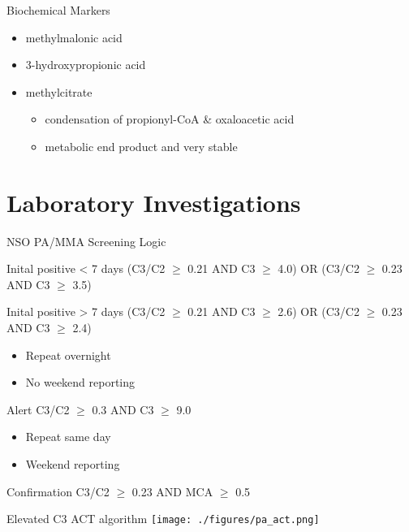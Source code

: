 \documentclass[presentation, smaller]{beamer}
\begin{document}
\begin{frame}[label={sec:orgheadline11}]{Biochemical Markers}
\begin{itemize}
\item methylmalonic acid
\item 3-hydroxypropionic acid
\item methylcitrate
\begin{itemize}
\item condensation of propionyl-CoA \& oxaloacetic acid
\item metabolic end product and very stable
\end{itemize}
\end{itemize}
\end{frame}

\section{Laboratory Investigations}
\label{sec:orgheadline19}
\begin{frame}[label={sec:orgheadline13}]{NSO PA/MMA Screening Logic}
\begin{block}{Inital positive \textless{} 7 days}
(C3/C2 \(\ge\) 0.21 AND C3 \(\ge\) 4.0)
OR
(C3/C2 \(\ge\) 0.23 AND C3 \(\ge\) 3.5)
\end{block}
\begin{block}{Inital positive \textgreater{} 7 days}
(C3/C2 \(\ge\) 0.21 AND C3 \(\ge\) 2.6)
OR
(C3/C2 \(\ge\) 0.23 AND C3 \(\ge\) 2.4)
\begin{itemize}
\item Repeat overnight
\item No weekend reporting
\end{itemize}
\end{block}
\begin{block}{Alert}
C3/C2 \(\ge\) 0.3 AND C3 \(\ge\) 9.0
\begin{itemize}
\item Repeat same day
\item Weekend reporting
\end{itemize}
\end{block}
\begin{block}{Confirmation}
C3/C2 \(\ge\) 0.23 AND MCA \(\ge\) 0.5
\end{block}
\end{frame}
\begin{frame}[label={sec:orgheadline14}]{Elevated C3 ACT algorithm}
\texttt{[image: ./figures/pa\_act.png]}
\end{frame}
\end{document}
